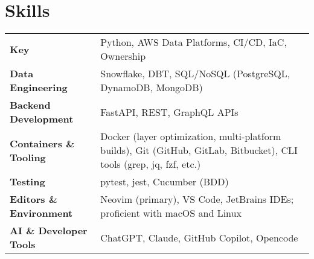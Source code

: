 \documentclass[a4paper,12pt]{article}
\begin{document}
\section{Skills}
\begin{tabularx}{\linewidth}{@{}l X@{}}
\textbf{Key} & Python, AWS Data Platforms, CI/CD, IaC, Ownership \\

\textbf{Data Engineering} & Snowflake, DBT, SQL/NoSQL (PostgreSQL, DynamoDB, MongoDB) \\

\textbf{Backend Development} & FastAPI, REST, GraphQL APIs \\

\textbf{Containers \& Tooling} & Docker (layer optimization, multi-platform builds), Git (GitHub, GitLab, Bitbucket), CLI tools (grep, jq, fzf, etc.) \\

\textbf{Testing} & pytest, jest, Cucumber (BDD) \\

\textbf{Editors \& Environment} & Neovim (primary), VS Code, JetBrains IDEs; proficient with macOS and Linux \\

\textbf{AI \& Developer Tools} & ChatGPT, Claude, GitHub Copilot, Opencode \\
\end{tabularx}

\vfill
{}
\end{document}
